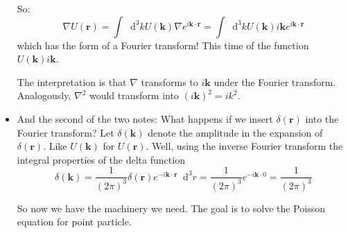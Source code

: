 \documentclass[11pt, a4paper]{article}
\newcommand{\diff}{\mathop{}\!\mathrm{d}} %
\renewcommand{\vec}[1]{\bm{#1}} %
\renewcommand{\r}{\vec{r}}
\renewcommand{\grad}{\nabla}
\begin{document}
\begin{itemize}
	So:
	\begin{equation*}
		\grad U(\r) = \int \diff^{3}k U(\vec{k}) \grad e^{i \vec{k}\cdot \r} = \int \diff^{3}k U(\vec{k})i \vec{k} e^{i \vec{k}\cdot \r}
	\end{equation*}
	which has the form of a Fourier transform! This time of the function $ U(\vec{k})i \vec{k} $. 
	
	The interpretation is that $ \grad $ transforms to $ i\vec{k} $ under the Fourier transform. Analogously, $ \nabla^{2} $ would transform into $ (i\vec{k})^{2} = i k^{2} $. 
	
	
	\item And the second of the two notes: What happens if we insert $ \delta(\r) $ into the Fourier transform? Let $ \delta(\vec{k}) $ denote the amplitude in the expansion of $ \delta(\r) $. Like $ U(\vec{k}) $ for $ U(\r) $. Well, using the inverse Fourier transform the integral properties of the delta function
	\begin{equation*}
		\delta (\vec{k}) = \frac{1}{(2\pi)^{3}} \delta(\r) e^{-i\vec{k}\cdot\r}\diff^{3}r = \frac{1}{(2\pi)^{3}} e^{-i\vec{k}\cdot 0} = \frac{1}{(2\pi)^{3}}
	\end{equation*}
	
	So now we have the machinery we need. The goal is to solve the Poisson equation for point particle.
\end{itemize}
\end{document}
